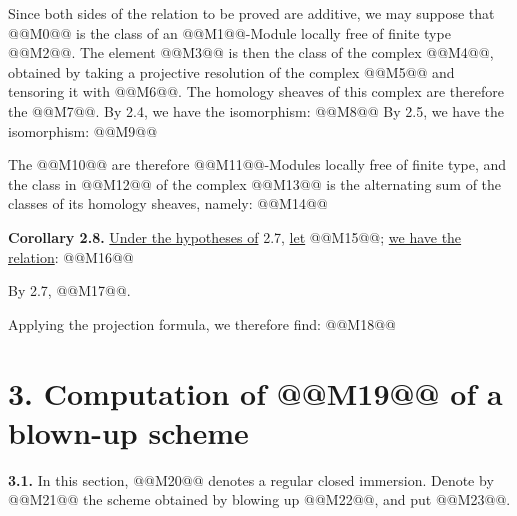 Since both sides of the relation to be proved are additive, we may suppose that @@M0@@ is the class of an @@M1@@-Module locally free of finite type @@M2@@. The element @@M3@@ is then the class of the complex @@M4@@, obtained by taking a projective resolution of the complex @@M5@@ and tensoring it with @@M6@@. The homology sheaves of this complex are therefore the @@M7@@. By 2.4, we have the isomorphism:
@@M8@@
By 2.5, we have the isomorphism:
@@M9@@

The @@M10@@ are therefore @@M11@@-Modules locally free of finite type, and the class in @@M12@@ of the complex @@M13@@ is the alternating sum of the classes of its homology sheaves, namely:
@@M14@@

\textbf{Corollary 2.8.} \uline{Under the hypotheses of} 2.7, \uline{let} @@M15@@; \uline{we have the relation}:
@@M16@@

By 2.7, @@M17@@.

Applying the projection formula, we therefore find:
@@M18@@

\section*{3. Computation of \texorpdfstring{@@M19@@}{K} of a blown-up scheme}

\textbf{3.1.} In this section, @@M20@@ denotes a regular closed immersion. Denote by @@M21@@ the scheme obtained by blowing up @@M22@@, and put @@M23@@.
